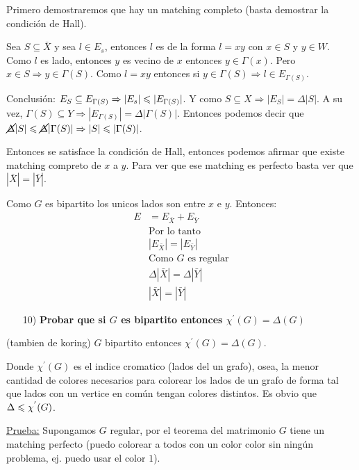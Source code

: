 \documentclass[12pt,a4paper]{article}
\begin{document}
Primero demostraremos que hay un matching completo (basta demostrar la condición de Hall).
\medskip

Sea $S \subseteq \bar{X}$ y sea $l \in E_{s}$, entonces $l$ es de la forma $l=xy$ con 
$x\in S$ y $y\in W$. Como $l$ es lado, entonces $y$ es vecino de $x$ entonces $y\in \Gamma(x)$. 
Pero $x\in S \Rightarrow y\in \Gamma(S)$. Como $l=xy$ entonces si $y\in \Gamma(S) \Rightarrow l\in E_{\Gamma(S)}$.
\medskip

Conclusión: $E_{S} \subseteq E_{\Gamma(S)} \Rightarrow |E_{s}| \leqslant |E_{\Gamma(S)}|$. Y 
como $S \subseteq X \Rightarrow |E_{S}| = \Delta |S|$. A su vez, $\Gamma(S) \subseteq Y \Rightarrow |E_{\Gamma(S)}| = \Delta |\Gamma(S)|$. 
Entonces podemos decir que $\cancel{\Delta} |S| \leqslant \cancel{\Delta} |\Gamma(S)| \Rightarrow |S| \leqslant |\Gamma(S)|$.
\medskip

Entonces se satisface la condición de Hall, entonces podemos afirmar que existe matching compreto 
de $x$ a $y$. Para ver que ese matching es perfecto basta ver que $|\bar{X}| = |\bar{Y}|$.
\medskip

Como $G$ es bipartito los unicos lados son entre $x$ e $y$. Entonces:
\begin{align*}
    E &= E_{\bar{X}} + E_{\bar{Y}}\\
    &\text{Por lo tanto}\\
    &|E_{\bar{X}}| = |E_{\bar{Y}}|\\
    &\text{Como $G$ es regular}\\
    &\Delta |\bar{X}| = \Delta |\bar{Y}|\\
    &|\bar{X}| = |\bar{Y}|
\end{align*}

\begin{itemize}
    \item [10)] \textbf{Probar que si $G$ es bipartito entonces $\chi^{'}(G) = \Delta(G)$}
    \label{dem:chi}
\end{itemize}

\begin{corolario} (tambien de koring) $G$ bipartito entonces $\chi^{'}(G) = \Delta(G)$.
\end{corolario}

Donde $\chi^{'}(G)$ es el indice cromatico (lados del un grafo), osea, la menor 
cantidad de colores necesarios para colorear los lados de un grafo de forma tal 
que lados con un vertice en común tengan colores distintos. Es obvio que $\Delta \leqslant \chi^{'}(G)$.
\medskip

\underline{Prueba:} Supongamos $G$ regular, por el teorema del matrimonio $G$ 
tiene un matching perfecto (puedo colorear a todos con un color color sin 
ningún problema, ej. puedo usar el color $1$).
\medskip
\end{document}
